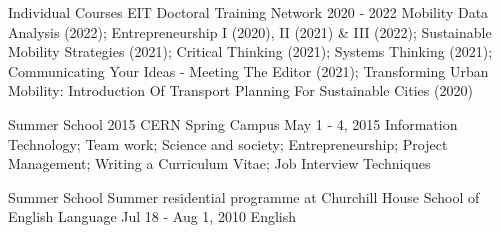 

\begin{cventries}
  \cventryshort
    {Individual Courses} %
    {EIT Doctoral Training Network} %
    {2020 - 2022} %
    {} %
    {
    Mobility Data Analysis (2022);
    Entrepreneurship I (2020), II (2021) \& III (2022);
    Sustainable Mobility Strategies (2021);
    Critical Thinking (2021); 
    Systems Thinking (2021); 
    Communicating Your Ideas - Meeting The Editor (2021);
    Transforming Urban Mobility: Introduction Of Transport Planning For Sustainable Cities (2020) 
    }
    
  \cventryshort
    {Summer School} %
    {2015 CERN Spring Campus} %
    {May 1 - 4, 2015} %
    {} %
    {
    Information Technology; 
    Team work;
    Science and society;
    Entrepreneurship;
    Project Management;
    Writing a Curriculum Vitae;
    Job Interview Techniques
    }

  \cventryshort
    {Summer School} %
    {Summer residential programme at Churchill House School of English Language} %
    {Jul 18 - Aug 1, 2010} %
    {} %
    {
    English
    }

\end{cventries}
